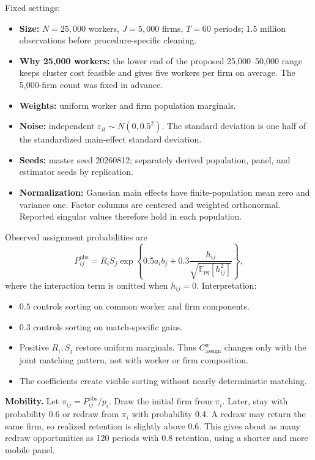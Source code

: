 \documentclass[11pt]{article}
\newcommand{\E}{\mathbb{E}}
\newcommand{\Cassign}{C^{w}_{\mathrm{assign}}}
\begin{document}
Fixed settings:
\begin{itemize}
\item \textbf{Size:} $N=25{,}000$ workers, $J=5{,}000$ firms, $T=60$ periods;
1.5 million observations before procedure-specific cleaning.
\item \textbf{Why 25,000 workers:} the lower end of the proposed
25,000--50,000 range keeps cluster cost feasible and gives five workers per
firm on average.  The 5,000-firm count was fixed in advance.
\item \textbf{Weights:} uniform worker and firm population marginals.
\item \textbf{Noise:} independent
$\varepsilon_{it}\sim N(0,0.5^2)$.  The standard deviation is one half of the
standardized main-effect standard deviation.
\item \textbf{Seeds:} master seed 20260812; separately derived population,
panel, and estimator seeds by replication.
\item \textbf{Normalization:} Gaussian main effects have finite-population
mean zero and variance one.  Factor columns are centered and weighted
orthonormal.  Reported singular values therefore hold in each population.
\end{itemize}

Observed assignment probabilities are
\begin{equation}
P^{\mathrm{obs}}_{ij}=R_iS_j\exp\!\left\{0.5a_ib_j
+0.3\frac{h_{ij}}{\sqrt{\E_{pq}[h_{ij}^2]}}\right\},
\label{eq:assignment}
\end{equation}
where the interaction term is omitted when $h_{ij}=0$.  Interpretation:
\begin{itemize}
\item $0.5$ controls sorting on common worker and firm components.
\item $0.3$ controls sorting on match-specific gains.
\item Positive $R_i,S_j$ restore uniform marginals.  Thus $\Cassign$ changes
only with the joint matching pattern, not with worker or firm composition.
\item The coefficients create visible sorting without nearly deterministic
matching.
\end{itemize}

\textbf{Mobility.} Let $\pi_{ij}=P^{\mathrm{obs}}_{ij}/p_i$.  Draw the initial
firm from $\pi_i$.  Later, stay with probability 0.6 or redraw from $\pi_i$
with probability 0.4.  A redraw may return the same firm, so realized retention
is slightly above 0.6.  This gives about as many redraw opportunities as 120
periods with 0.8 retention, using a shorter and more mobile panel.
\end{document}

